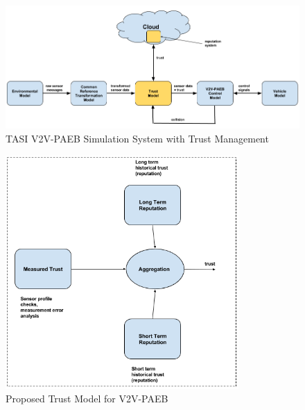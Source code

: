 \documentclass[conference]{IEEEtran}
\begin{document}
\begin{figure}
  \includegraphics[width=\textwidth]{V2V_Tust_Management_System.png}
  \caption{TASI V2V-PAEB Simulation System with Trust Management}
  \label{tforV2V}
\end{figure}


\begin{figure}[h]
\centering
\includegraphics[width=3.5in]{Trust_Model.png}
\caption{Proposed Trust Model for V2V-PAEB}
\label{tmodel}
\end{figure}
\end{document}
